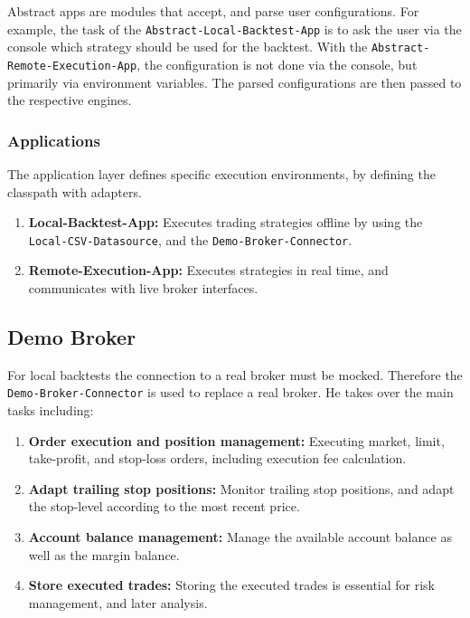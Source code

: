 Abstract apps are modules that accept, and parse user configurations. For example, the task of the \verb|Abstract-Local-Backtest-App| is to ask the user via the console which strategy should be used for the backtest. With the \verb|Abstract-Remote-Execution-App|, the configuration is not done via the console, but primarily via environment variables. The parsed configurations are then passed to the respective engines.

\subsubsection{Applications}

The application layer defines specific execution environments, by defining the classpath with adapters.

\begin{enumerate}
    \item \textbf{Local-Backtest-App:} Executes trading strategies offline by using the \verb|Local-CSV-Datasource|, and the \verb|Demo-Broker-Connector|.
    \item \textbf{Remote-Execution-App:} Executes strategies in real time, and communicates with live broker interfaces.
\end{enumerate}

\subsection{Demo Broker}

For local backtests the connection to a real broker must be mocked. Therefore the \verb|Demo-Broker-Connector| is used to replace a real broker. He takes over the main tasks including:

\begin{enumerate}
    \item \textbf{Order execution and position management:} Executing market, limit, take-profit, and stop-loss orders, including execution fee calculation.
    \item \textbf{Adapt trailing stop positions:} Monitor trailing stop positions, and adapt the stop-level according to the most recent price.
    \item \textbf{Account balance management:} Manage the available account balance as well as the margin balance.
    \item \textbf{Store executed trades:} Storing the executed trades is essential for risk management, and later analysis.
\end{enumerate}

